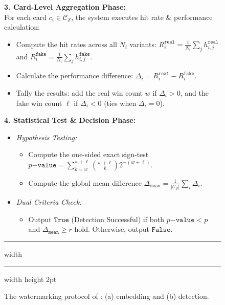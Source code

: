 \begin{figure}[!t]
\noindent \textbf{3. Card-Level Aggregation Phase:} \\
For each card $c_i \in \mathcal{C}_{\mathcal{S}}$, the system executes hit rate \& performance calculation:
\begin{itemize}
        \item[\textendash] Compute the hit rates across all $N_i$ variants: $R_i^{\mathtt{real}} = \frac{1}{N_i} \sum_{j} h_{i,j}^{\mathtt{real}}$ and $R_i^{\mathtt{fake}} = \frac{1}{N_i} \sum_{j} h_{i,j}^{\mathtt{fake}}$.
        \item[\textendash] Calculate the performance difference: $\Delta_i = R_i^{\mathtt{real}} - R_i^{\mathtt{fake}}$.
        \item[\textendash] Tally the results: add the real win count $w$ if $\Delta_i > 0$, and the fake win count $\ell$ if $\Delta_i < 0$ (ties when $\Delta_i = 0$).
    \end{itemize}


\noindent \textbf{4. Statistical Test \& Decision Phase:} 
\begin{itemize}
    \item \textit{Hypothesis Testing:}
\begin{itemize}
        \item Compute the one-sided exact sign-test $p\mathtt{-value} = \sum_{k=w}^{w+\ell}\binom{w+\ell}{k}2^{-(w+\ell)}$.
        \item Compute the global mean difference $\Delta_{\mathtt{mean}} = \frac{1}{|\mathcal{C}_{\mathcal{S}}|} \sum_{i} \Delta_i$.
    \end{itemize}
    
    \item \textit{Dual Criteria Check:}
\begin{itemize}
        \item Output $\mathtt{True}$ (Detection Successful) if both $p\mathtt{-value} < p$ and $\Delta_{\mathtt{mean}} \ge r$ hold. Otherwise, output $\mathtt{False}$.
    \end{itemize}
\end{itemize}

\hrule width \hsize \kern 1mm \hrule width \hsize height 2pt 
\caption{The watermarking protocol of \name{}: (a) embedding and (b) detection.}
\label{fig:watermark_protocols}
\label{fig:watermark_embedding_protocol}
\label{fig:watermark_detection_protocol}
\end{figure}




